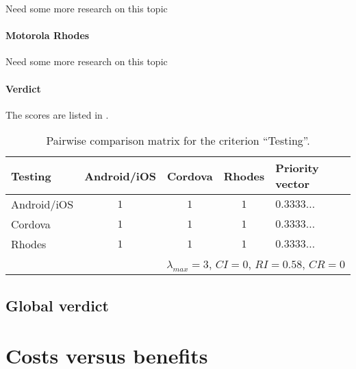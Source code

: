 Need some more research on this topic

\paragraph{Motorola Rhodes} 

Need some more research on this topic

\paragraph{Verdict} The scores are listed in .

\begin{table}[h!]
    \begin{center}
        \begin{tabular}{lcccl}
            \hline
            \textbf{Testing} & Android/iOS & Cordova & Rhodes & Priority vector \\
            \hline
            Android/iOS      & $1$         & $1$     & $1$    & $0.3333\ldots$        \\
            Cordova          & $1$         & $1$     & $1$    & $0.3333\ldots$        \\
            Rhodes           & $1$         & $1$     & $1$    & $0.3333\ldots$        \\
            \hline
            \multicolumn{5}{r}{$\lambda_{max} = 3$, $CI = 0$, $RI = 0.58$, $CR = 0$}\\
            \hline
        \end{tabular}
        \caption{Pairwise comparison matrix for the criterion ``Testing''.}
        \label{tab:testing}
    \end{center}
\end{table}

\subsection*{Global verdict}




\section{Costs versus benefits}














